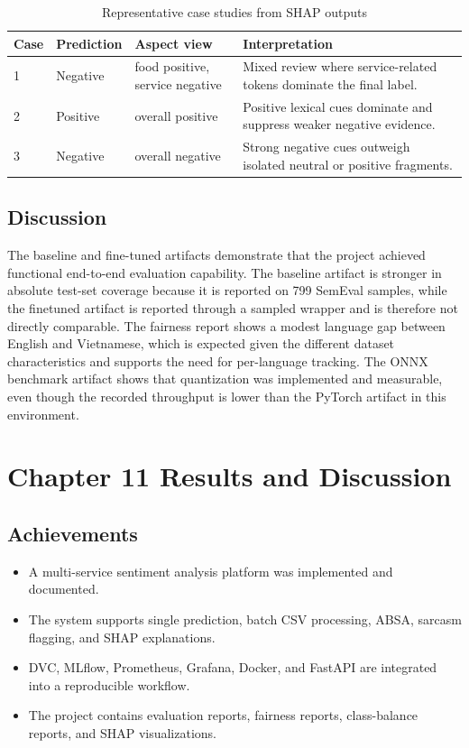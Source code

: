 \documentclass[12pt, a4paper]{article}
\begin{document}
\begin{table}[H]
\centering
\caption{Representative case studies from SHAP outputs}
\begin{tabularx}{\textwidth}{@{} p{1.4cm} p{2.5cm} p{2.8cm} X @{}}
\toprule
\textbf{Case} & \textbf{Prediction} & \textbf{Aspect view} & \textbf{Interpretation} \\
\midrule
1 & Negative & food positive, service negative & Mixed review where service-related tokens dominate the final label. \\
2 & Positive & overall positive & Positive lexical cues dominate and suppress weaker negative evidence. \\
3 & Negative & overall negative & Strong negative cues outweigh isolated neutral or positive fragments. \\
\bottomrule
\end{tabularx}
\end{table}

\subsection{Discussion}
The baseline and fine-tuned artifacts demonstrate that the project achieved functional end-to-end evaluation capability. The baseline artifact is stronger in absolute test-set coverage because it is reported on 799 SemEval samples, while the finetuned artifact is reported through a sampled wrapper and is therefore not directly comparable. The fairness report shows a modest language gap between English and Vietnamese, which is expected given the different dataset characteristics and supports the need for per-language tracking. The ONNX benchmark artifact shows that quantization was implemented and measurable, even though the recorded throughput is lower than the PyTorch artifact in this environment.

\section{Chapter 11 Results and Discussion}

\subsection{Achievements}
\begin{itemize}[noitemsep]
  \item A multi-service sentiment analysis platform was implemented and documented.
  \item The system supports single prediction, batch CSV processing, ABSA, sarcasm flagging, and SHAP explanations.
  \item DVC, MLflow, Prometheus, Grafana, Docker, and FastAPI are integrated into a reproducible workflow.
  \item The project contains evaluation reports, fairness reports, class-balance reports, and SHAP visualizations.
\end{itemize}
\end{document}
